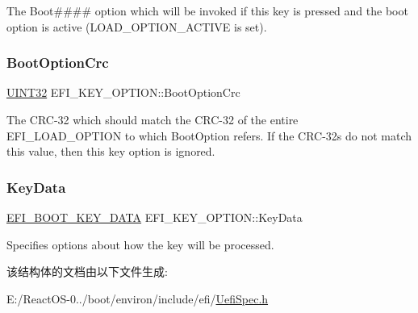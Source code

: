 The Boot\#\#\#\# option which will be invoked if this key is pressed and the boot option is active (L\+O\+A\+D\+\_\+\+O\+P\+T\+I\+O\+N\+\_\+\+A\+C\+T\+I\+VE is set). \mbox{\label{struct_e_f_i___k_e_y___o_p_t_i_o_n_aa6cdcd2eae63b279bba8979a6d89995d}} 
\subsubsection{\texorpdfstring{Boot\+Option\+Crc}{BootOptionCrc}}
{\footnotesize\ttfamily \hyperlink{_processor_bind_8h_ae1e6edbbc26d6fbc71a90190d0266018}{U\+I\+N\+T32} E\+F\+I\+\_\+\+K\+E\+Y\+\_\+\+O\+P\+T\+I\+O\+N\+::\+Boot\+Option\+Crc}

The C\+R\+C-\/32 which should match the C\+R\+C-\/32 of the entire E\+F\+I\+\_\+\+L\+O\+A\+D\+\_\+\+O\+P\+T\+I\+ON to which Boot\+Option refers. If the C\+R\+C-\/32s do not match this value, then this key option is ignored. \mbox{\label{struct_e_f_i___k_e_y___o_p_t_i_o_n_af1d71adda55302fa05dd49abaa79d2c8}} 
\subsubsection{\texorpdfstring{Key\+Data}{KeyData}}
{\footnotesize\ttfamily \hyperlink{union_e_f_i___b_o_o_t___k_e_y___d_a_t_a}{E\+F\+I\+\_\+\+B\+O\+O\+T\+\_\+\+K\+E\+Y\+\_\+\+D\+A\+TA} E\+F\+I\+\_\+\+K\+E\+Y\+\_\+\+O\+P\+T\+I\+O\+N\+::\+Key\+Data}

Specifies options about how the key will be processed. 

该结构体的文档由以下文件生成\+:\begin{DoxyCompactItemize}
\item 
E\+:/\+React\+O\+S-\/0../boot/environ/include/efi/\hyperlink{_uefi_spec_8h}{Uefi\+Spec.\+h}\end{DoxyCompactItemize}
